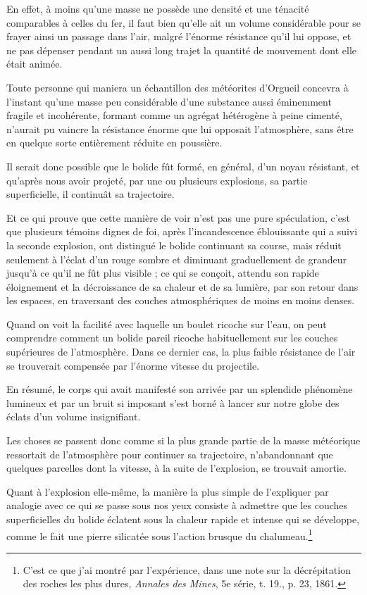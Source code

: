 \documentclass[a4paper, 11pt, oneside, polutonikogreek, french]{article}
\begin{document}
En effet, à moins qu'une masse ne possède une densité et une ténacité comparables à celles du fer, il faut bien qu'elle ait un volume considérable pour se frayer ainsi un passage dans l'air, malgré l'énorme résistance qu'il lui oppose, et ne pas dépenser pendant un aussi long trajet la quantité de mouvement dont elle était animée.

Toute personne qui maniera un échantillon des météorites d'Orgueil concevra à l'instant qu'une masse peu considérable d'une substance aussi éminemment fragile et incohérente, formant comme un agrégat hétérogène à peine cimenté, n'aurait pu vaincre la résistance énorme que lui opposait l'atmosphère, sans être en quelque sorte entièrement réduite en poussière.

Il serait donc possible que le bolide fût formé, en général, d'un noyau résistant, et qu'après nous avoir projeté, par une ou plusieurs explosions, sa partie superficielle, il continuât sa trajectoire.

Et ce qui prouve que cette manière de voir n'est pas une pure spéculation, c'est que plusieurs témoins dignes de foi, après l'incandescence éblouissante qui a suivi la seconde explosion, ont distingué le bolide continuant sa course, mais réduit seulement à l'éclat d'un rouge sombre et diminuant graduellement de grandeur jusqu'à ce qu'il ne fût plus visible ; ce qui se conçoit, attendu son rapide éloignement et la décroissance de sa chaleur et de sa lumière, par son retour dans les espaces, en traversant des couches atmosphériques de moins en moins denses.

Quand on voit la facilité avec laquelle un boulet ricoche sur l'eau, on peut comprendre comment un bolide pareil ricoche habituellement sur les couches supérieures de l'atmosphère. Dans ce dernier cas, la plus faible résistance de l'air se trouverait compensée par l'énorme vitesse du projectile.

En résumé, le corps qui avait manifesté son arrivée par un splendide phénomène lumineux et par un bruit si imposant s'est borné à lancer sur notre globe des éclats d'un volume insignifiant.

Les choses se passent donc comme si la plus grande partie de la masse météorique ressortait de l'atmosphère pour continuer sa trajectoire, n'abandonnant que quelques parcelles dont la vitesse, à la suite de l'explosion, se trouvait amortie.

Quant à l'explosion elle-même, la manière la plus simple de l'expliquer par analogie avec ce qui se passe sous nos yeux consiste à admettre que les couches superficielles du bolide éclatent sous la chaleur rapide et intense qui se développe, comme le fait une pierre silicatée sous l'action brusque du chalumeau.\footnote{C'est ce que j'ai montré par l'expérience, dans une note sur la décrépitation des roches les plus dures, \emph{Annales des Mines}, 5e série, t. 19., p. 23, 1861.}
\end{document}
